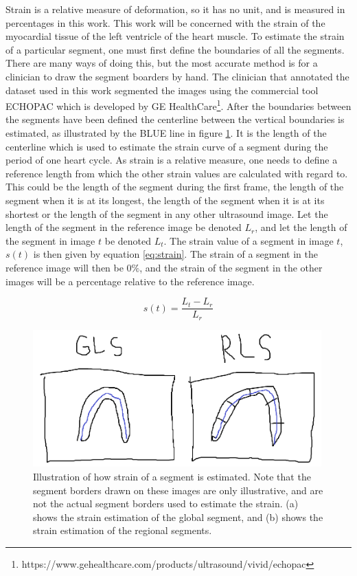 Strain is a relative measure of deformation, so it has no unit, and is measured in percentages in this work. This work will be concerned with the strain of the myocardial tissue of the left ventricle of the heart muscle. To estimate the strain of a particular segment, one must first define the boundaries of all the segments. There are many ways of doing this, but the most accurate method is for a clinician to draw the segment boarders by hand. The clinician that annotated the dataset used in this work segmented the images using the commercial tool ECHOPAC which is developed by GE HealthCare\footnote{https://www.gehealthcare.com/products/ultrasound/vivid/echopac}. After the boundaries between the segments have been defined the centerline between the vertical boundaries is estimated, as illustrated by the BLUE line in figure \ref{fig:strain_estimation}. It is the length of the centerline which is used to estimate the strain curve of a segment during the period of one heart cycle. As strain is a relative measure, one needs to define a reference length from which the other strain values are calculated with regard to. This could be the length of the segment during the first frame, the length of the segment when it is at its longest, the length of the segment when it is at its shortest or the length of the segment in any other ultrasound image. Let the length of the segment in the reference image be denoted $L_r$, and let the length of the segment in image $t$ be denoted $L_t$. The strain value of a segment in image $t$, $s(t)$ is then given by equation \eqref{eq:strain}. The strain of a segment in the reference image will then be $0\%$, and the strain of the segment in the other images will be a percentage relative to the reference image. \bigskip

\begin{equation}
    s(t) = \frac{L_t - L_r}{L_r}
    \label{eq:strain}
\end{equation}

\begin{figure}[H]
    \centering
    \includegraphics[width=0.99\textwidth]{echocardiography/strain_estimation.png}
    \caption{Illustration of how strain of a segment is estimated. Note that the segment borders drawn on these images are only illustrative, and are not the actual segment borders used to estimate the strain. (a) shows the strain estimation of the global segment, and (b) shows the strain estimation of the regional segments.}
    \label{fig:strain_estimation}
\end{figure}

